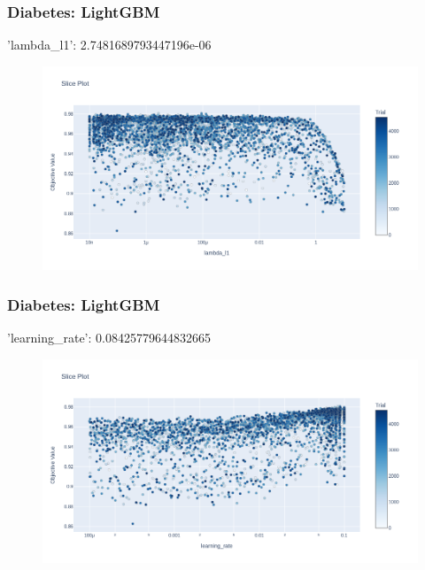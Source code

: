 \documentclass{beamer}
\begin{document}
\begin{frame}
\frametitle{Diabetes: LightGBM}
'lambda\_l1': 2.7481689793447196e-06
\begin{figure}[H]
 \label{fig:op:dia:lamb:lgbm}
 \centering
 \includegraphics[scale=0.3]{optuna_lgbm_lambda_dia.png}
\end{figure}
\end{frame}
\begin{frame}
\frametitle{Diabetes: LightGBM}
'learning\_rate': 0.08425779644832665
\begin{figure}[H]
 \label{fig:op:dia:lamb:lgbm}
 \centering
 \includegraphics[scale=0.3]{optuna_lgbm_learn_dia.png}
\end{figure}
\end{frame}
\end{document}
